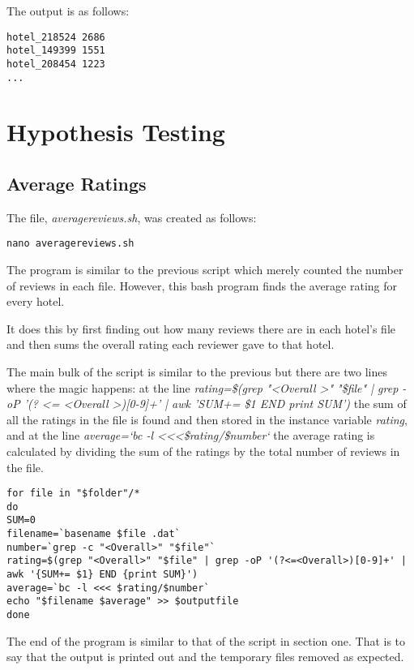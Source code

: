 \documentclass{article}
\begin{document}
The output is as follows:

\begin{lstlisting}
hotel_218524 2686
hotel_149399 1551
hotel_208454 1223
...
\end{lstlisting}

\section{Hypothesis Testing}

\subsection{Average Ratings}

The file, {\it averagereviews.sh}, was created as follows:

\begin{lstlisting}
nano averagereviews.sh
\end{lstlisting}

The program is similar to the previous script which merely counted the number of reviews in each file. However, this bash program finds the average rating for every hotel. \par It does this by first finding out how many reviews there are in each hotel's file and then sums the overall rating each reviewer gave to that hotel. \par The main bulk of the script is similar to the previous but there are two lines where the magic happens: at the line \textit{rating=\$(grep "\textless Overall \textgreater" "\$file" | grep -oP '(? \textless = \textless Overall \textgreater)[0-9]+' | awk '{SUM+= \$1} END {print SUM}')} the sum of all the ratings in the file is found and then stored in the instance variable \textit{rating}, and at the line \textit{average=`bc -l \textless \textless \textless \$rating/\$number`} the average rating is calculated by dividing the sum of the ratings by the total number of reviews in the file.

\begin{lstlisting}
for file in "$folder"/*
do
SUM=0
filename=`basename $file .dat`
number=`grep -c "<Overall>" "$file"`
rating=$(grep "<Overall>" "$file" | grep -oP '(?<=<Overall>)[0-9]+' | awk '{SUM+= $1} END {print SUM}')	
average=`bc -l <<< $rating/$number`
echo "$filename $average" >> $outputfile
done
\end{lstlisting}

The end of the program is similar to that of the script in section one. That is to say that the output is printed out and the temporary files removed as expected.
\end{document}
